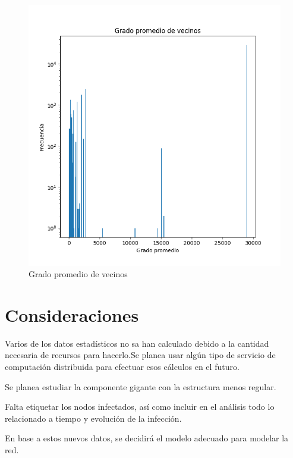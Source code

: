 \documentclass[12pt]{extreport}
\begin{document}
    \begin{figure}
        \centering
        \includegraphics[scale=0.75]{avg_nei_degree.png}
        \caption{Grado promedio de vecinos}
        \label{fig:degeavgnei}
    \end{figure}

    \section*{Consideraciones}

    Varios de los datos estadísticos no sa han calculado debido a la cantidad 
    necesaria de recursos para hacerlo.Se planea usar algún tipo de servicio 
    de computación distribuida para efectuar esos cálculos en el futuro.

    Se planea estudiar la componente gigante con  la estructura menos regular.

    Falta etiquetar los nodos infectados, así como incluir en el análisis todo lo 
    relacionado a tiempo y evolución de la infección.
    
    En base a estos nuevos datos, se decidirá el modelo adecuado para modelar la red.
    
\end{document}
